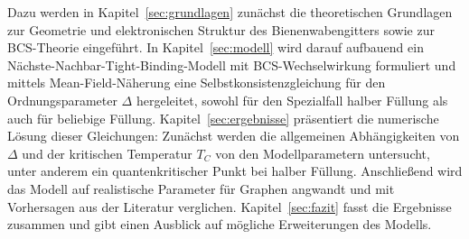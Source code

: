 Dazu werden in Kapitel~\ref{sec:grundlagen} zunächst die theoretischen Grundlagen zur Geometrie und elektronischen Struktur des Bienenwabengitters sowie zur BCS-Theorie eingeführt.  
In Kapitel~\ref{sec:modell} wird darauf aufbauend ein Nächste-Nachbar-Tight-Binding-Modell mit BCS-Wechselwirkung formuliert und mittels Mean-Field-Näherung eine Selbstkonsistenzgleichung für den Ordnungsparameter $\Delta$ hergeleitet, sowohl für den Spezialfall halber Füllung als auch für beliebige Füllung.
Kapitel~\ref{sec:ergebnisse} präsentiert die numerische Lösung dieser Gleichungen:
Zunächst werden die allgemeinen Abhängigkeiten von $\Delta$ und der kritischen Temperatur $T_C$ von den Modellparametern untersucht, unter anderem ein quantenkritischer Punkt bei halber Füllung. 
Anschließend wird das Modell auf realistische Parameter für Graphen angwandt und mit Vorhersagen aus der Literatur verglichen. 
Kapitel~\ref{sec:fazit} fasst die Ergebnisse zusammen und gibt einen
Ausblick auf mögliche Erweiterungen des Modells.